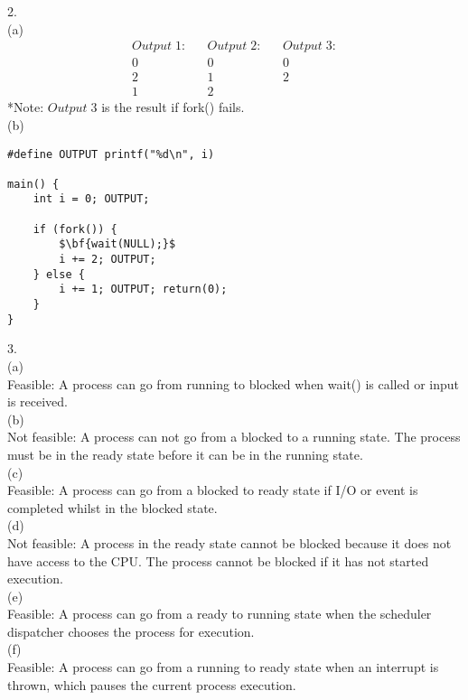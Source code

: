 \documentclass{article}
\begin{document}
\bigskip

2.\\
(a)
\begin{align*}
Output\;1: && Output\;2: && Output\;3:\\
0 && 0 && 0\\
2 && 1 && 2\\
1 && 2 
\end{align*}
*Note: $Output \; 3$ is the result if fork() fails.\\

\smallskip
(b)
\begin{lstlisting}[mathescape=true]
#define OUTPUT printf("%d\n", i)

main() {
    int i = 0; OUTPUT;

    if (fork()) {
        $\bf{wait(NULL);}$
        i += 2; OUTPUT;
    } else {
        i += 1; OUTPUT; return(0);
    }
}
\end{lstlisting}

\bigskip

3.\\
(a)\\ 
Feasible: A process can go from running to blocked when wait() is called or input is received.\\

\smallskip
(b)\\
Not feasible: A process can not go from a blocked to a running state. The process must be in the ready state before it can be in the running state.\\

\smallskip
(c)\\
Feasible: A process can go from a blocked to ready state if I/O or event is completed whilst in the blocked state.\\

\smallskip
(d)\\
Not feasible: A process in the ready state cannot be blocked because it does not have access to the CPU. The process cannot be blocked if it has not started execution.\\

\smallskip
(e)\\
Feasible: A process can go from a ready to running state when the scheduler dispatcher chooses the process for execution.\\

\smallskip
(f)\\
Feasible: A process can go from a running to ready state when an interrupt is thrown, which pauses the current process execution.\\
\end{document}
